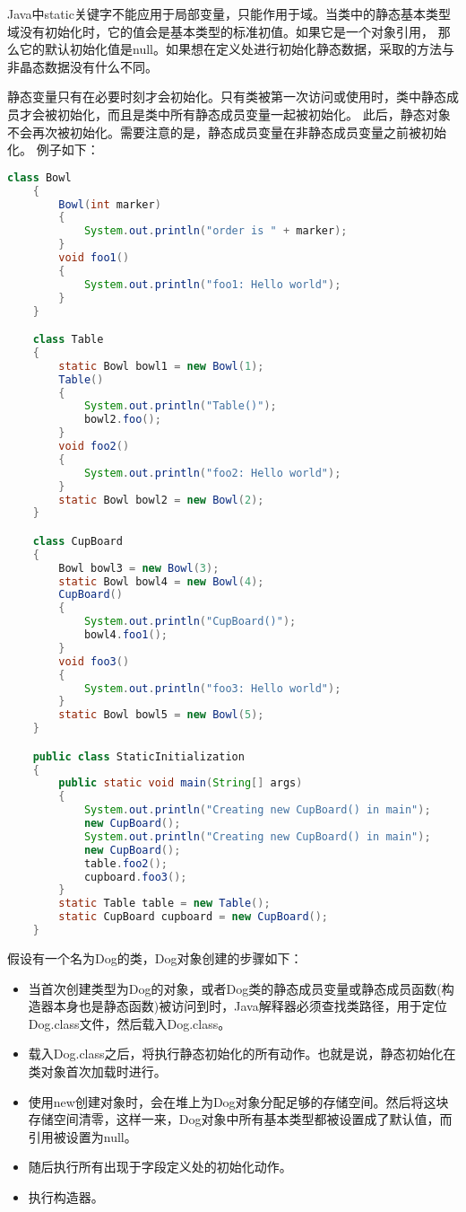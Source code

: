 \documentclass[a4paper,left=2.5cm,right=2.5cm,11pt]{article}
\begin{document}
	Java中static关键字不能应用于局部变量，只能作用于域。当类中的静态基本类型域没有初始化时，它的值会是基本类型的标准初值。如果它是一个对象引用，
	那么它的默认初始化值是null。如果想在定义处进行初始化静态数据，采取的方法与非晶态数据没有什么不同。\par
	静态变量只有在必要时刻才会初始化。只有类被第一次访问或使用时，类中静态成员才会被初始化，而且是类中所有静态成员变量一起被初始化。
	此后，静态对象不会再次被初始化。需要注意的是，静态成员变量在非静态成员变量之前被初始化。
	例子如下：
	\begin{lstlisting}[language = Java]
	class Bowl
	{
		Bowl(int marker)
		{
			System.out.println("order is " + marker);
		}
		void foo1()
		{
			System.out.println("foo1: Hello world");
		}
	}

	class Table
	{
		static Bowl bowl1 = new Bowl(1);
		Table()
		{
			System.out.println("Table()");
			bowl2.foo();
		}
		void foo2()
		{
			System.out.println("foo2: Hello world");
		}
		static Bowl bowl2 = new Bowl(2);
	}

	class CupBoard
	{
		Bowl bowl3 = new Bowl(3);
		static Bowl bowl4 = new Bowl(4);
		CupBoard()
		{
			System.out.println("CupBoard()");
			bowl4.foo1();
		}
		void foo3()
		{
			System.out.println("foo3: Hello world");
		}
		static Bowl bowl5 = new Bowl(5);
	}

	public class StaticInitialization
	{
		public static void main(String[] args)
		{
			System.out.println("Creating new CupBoard() in main");
			new CupBoard();
			System.out.println("Creating new CupBoard() in main");
			new CupBoard();
			table.foo2();
			cupboard.foo3();
		}
		static Table table = new Table();
		static CupBoard cupboard = new CupBoard();
	}
	\end{lstlisting}

	假设有一个名为Dog的类，Dog对象创建的步骤如下：
	\begin{itemize}
		\item 当首次创建类型为Dog的对象，或者Dog类的静态成员变量或静态成员函数(构造器本身也是静态函数)被访问到时，Java解释器必须查找类路径，用于定位Dog.class文件，然后载入Dog.class。
		\item 载入Dog.class之后，将执行静态初始化的所有动作。也就是说，静态初始化在类对象首次加载时进行。
		\item 使用new创建对象时，会在堆上为Dog对象分配足够的存储空间。然后将这块存储空间清零，这样一来，Dog对象中所有基本类型都被设置成了默认值，而引用被设置为null。
		\item 随后执行所有出现于字段定义处的初始化动作。
		\item 执行构造器。
	\end{itemize}
\end{document}
